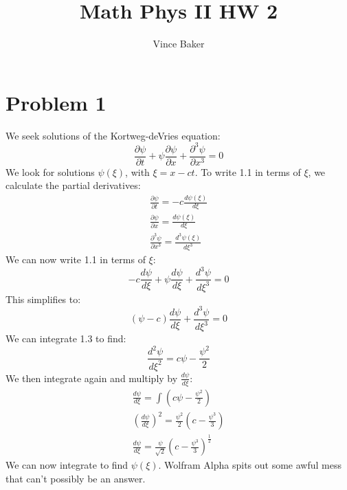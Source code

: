 \documentclass[a4paper,10pt]{article}
\title{Math Phys II HW 2}
\author{Vince Baker}
\numberwithin{equation}{section}
\begin{document}
\maketitle

\begin{abstract}

\end{abstract}

\section{Problem 1}
We seek solutions of the Kortweg-deVries equation:
\begin{equation}
 \frac{\partial \psi}{\partial t}+\psi\frac{\partial \psi}{\partial x}+\frac{\partial ^3 \psi}{\partial x^3}=0
\end{equation}
We look for solutions $\psi(\xi)$, with $\xi=x-ct$. To write 1.1 in terms of $\xi$, we calculate the partial derivatives:
\begin{gather*}
 \frac{\partial \psi}{\partial t}=-c\frac{d \psi(\xi)}{d \xi}\\
 \frac{\partial \psi}{\partial x}=\frac{d \psi(\xi)}{d \xi}\\
 \frac{\partial^3 \psi}{\partial x^3}=\frac{d^3 \psi(\xi)}{d \xi ^3}
\end{gather*}
We can now write 1.1 in terms of $\xi$:
\begin{equation} 
-c\frac{d \psi}{d \xi}+\psi\frac{d \psi}{d \xi}+\frac{d^3 \psi}{d \xi ^3}=0
\end{equation}
This simplifies to:
\begin{equation}
 (\psi-c)\frac{d \psi}{d \xi}+\frac{d^3 \psi}{d \xi ^3}=0
\end{equation}
We can integrate 1.3 to find:
\begin{equation}
 \frac{d^2\psi}{d\xi^2}=c\psi-\frac{\psi^2}{2}
\end{equation}
We then integrate again and multiply by $\frac{d \psi}{d \xi}$:
\begin{gather}
\frac{d\psi}{d\xi}=\int(c\psi-\frac{\psi^2}{2})\\
(\frac{d\psi}{d\xi})^2=\frac{\psi^2}{2}(c-\frac{\psi^3}{3})\\
\frac{d\psi}{d\xi}=\frac{\psi}{\sqrt{2}}(c-\frac{\psi^3}{3})^\frac{1}{2}
\end{gather}
We can now integrate to find $\psi (\xi)$. Wolfram Alpha spits out some awful mess that can't possibly be an answer.
\end{document}
